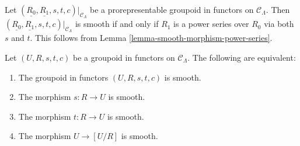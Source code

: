 \begin{remark}
\label{remark-smooth-power-series-prorepresentable-smooth-groupoid-in-functors}
Let $(\underline{R_0}, \underline{R_1}, s,t,c)|_{\mathcal C_{\Lambda}}$ be a 
prorepresentable groupoid in functors on $\mathcal C_{\Lambda}$.  Then 
$(\underline{R_0}, \underline{R_1}, s,t,c)|_{\mathcal C_{\Lambda}}$ is smooth 
if and only if $R_1$ is a power series over $R_0$ via both $s$ and $t$.  This 
follows from
Lemma \ref{lemma-smooth-morphism-power-series}.
\end{remark}

\begin{lemma}
\label{lemma-smooth-quotient-morphism}
Let $(U, R, s,t,c)$ be a groupoid in functors on $\mathcal C_{\Lambda}$.  The 
following are equivalent: 
\begin{enumerate}
\item The groupoid in functors $(U, R, s,t,c)$ is smooth.
\item The morphism $s: R \rightarrow U$ is smooth.
\item The morphism $t: R \rightarrow U$ is smooth.
\item The morphism $U \rightarrow [U/R]$ is smooth.
\end{enumerate}
\end{lemma}

